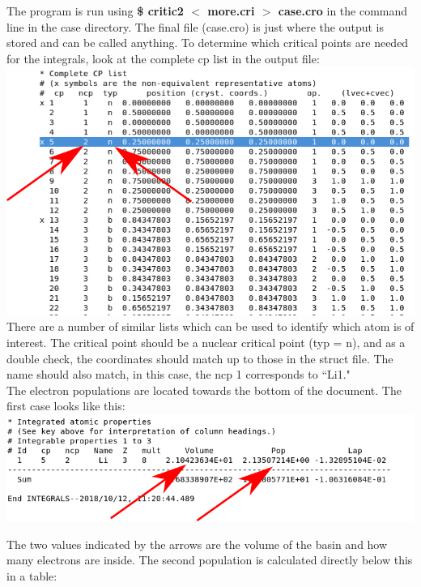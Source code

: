 \documentclass[12pt]{article}
\begin{document}
The program is run using \textbf{\$ critic2 $<$ more.cri $>$ case.cro} in the command line in the case directory.  The final file (case.cro) is just where the output is stored and can be called anything.  To determine which critical points are needed for the integrals, look at the complete cp list in the output file: \\

\includegraphics[scale=0.4]{./images/cro_cplist.png}\\

There are a number of similar lists which can be used to identify which atom is of interest.  The critical point should be a nuclear critical point (typ = n), and as a double check, the coordinates should match up to those in the struct file.  The name should also match, in this case, the ncp 1 corresponds to ``Li1."\\

The electron populations are located towards the bottom of the document.  The first case looks like this: \\

\includegraphics[scale=0.5]{./images/integrals.png}

The two values indicated by the arrows are the volume of the basin and how many electrons are inside. The second population is calculated directly below this in a table: \\
\end{document}
